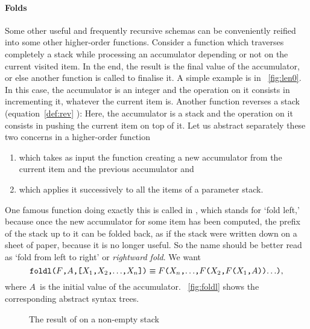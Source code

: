 \paragraph{Folds}
\label{par:folds}

Some other useful and frequently recursive schemas can be conveniently
reified into some other higher\hyp{}order functions. Consider a
function which traverses completely a stack while processing an
accumulator depending or not on the current visited item. In the end,
the result is the final value of the accumulator, or else another
function is called to finalise it. A simple example is  in
\fig~\vref{fig:len0}. In this case, the accumulator is an integer and
the operation on it consists in incrementing it, whatever the current
item is. Another function reverses a stack (equation~\eqref{def:rev}
):  Here, the accumulator is
a stack and the operation on it consists in pushing the current item
on top of it. Let us abstract separately these two concerns in a
higher\hyp{}order function
\begin{enumerate}

  \item which takes as input the function creating a new accumulator
    from the current item and the previous accumulator and

  \item which applies it successively to all the items of a parameter
    stack.

\end{enumerate}
One famous function doing exactly this is called  in
\Erlang, which stands for `fold left,' because once the new
accumulator for some item has been computed, the prefix of the stack
up to it can be folded back, as if the stack were written down on a
sheet of paper, because it is no longer useful. So the name should be
better read as `fold from left to right' or \emph{rightward fold}. We
want
\begin{equation*}
\texttt{foldl(\(F\),\(A\),[\(X_1\),\(X_2\),\(\ldots\),\(X_{n}\)])}
\equiv
\texttt{\(F\)(\(X_{n}\),\(\ldots\),\(F\)(\(X_2\),\(F\)(\(X_1\),\(A\)))\(\ldots\))},
\end{equation*}
where \(A\)~is the initial value of the
accumulator. \Fig~\vref{fig:foldl} shows the corresponding abstract
syntax trees.
\begin{figure}[b]
\centering
{}
\qquad
{}
\caption{The result of  on a non\hyp{}empty stack
\label{fig:foldl}}
\end{figure}
